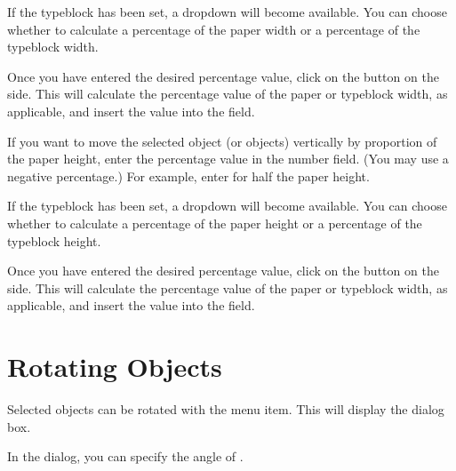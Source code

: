 If the \gls{typeblock} has been set, a \gls{dropdown} will become
available. You can choose whether to calculate a percentage of the
paper width or a percentage of the \gls{typeblock} width.


Once you have entered the desired percentage value, click on the
 button on the side. This will calculate
the percentage value of the paper or \gls{typeblock} width, as
applicable, and insert the value into
the  field.


If you want to move the selected \gls{object} (or \glspl{object})
vertically by proportion of the paper height, enter the percentage
value in the  number field. (You may
use a negative percentage.) For example, enter  for half
the paper height.

If the \gls{typeblock} has been set, a \gls{dropdown} will become
available. You can choose whether to calculate a percentage of the
paper height or a percentage of the \gls{typeblock} height.


Once you have entered the desired percentage value, click on the
 button on the side. This will calculate
the percentage value of the paper or \gls{typeblock} width, as
applicable, and insert the value into
the  field.

\section{Rotating Objects}\label{sec:rotateobjects}


Selected \glspl{object} can be rotated with the
 menu item. This will display the
 dialog box.


In the  dialog,
you can specify the angle of
.

